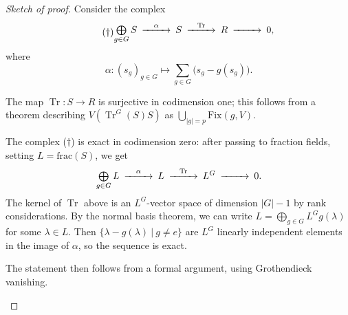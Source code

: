 \documentclass[12pt]{amsart}
\theoremstyle{definition}
\numberwithin{equation}{theorem}
\def\image{\operatorname{image}}
\def\Tr{\operatorname{Tr}}
\def\ff{\operatorname{frac}}
\def\frakn{\mathfrak{n}}
\def\to{\longrightarrow}
\def\mapsto{\longmapsto}
\begin{document}
\begin{proof}[Sketch of proof]
Consider the complex
\[ \tag{$\dagger$}
\CD
\bigoplus\limits_{g \in G} S @>\alpha>> S @>\Tr>> R @>>> 0,
\endCD
\]
where \[
\alpha\colon(s_g)_{g\in G} \mapsto \sum_{g\in G}\big(s_g - g(s_g)\big).
\]
\begin{asparaenum}
\item The map $\Tr:S \to R$ is surjective in codimension one; this follows from a theorem describing $V( \Tr^G(S) S )$ as $\bigcup_{|g|=p} \mathrm{Fix}(g,V)$.
\item The complex ($\dagger$) is  exact in codimension zero: after passing to fraction fields, setting $L=\mathrm{frac}(S)$, we get
\[ 
\CD
\bigoplus\limits_{g \in G} L @>\alpha>> L @>\Tr>> L^G @>>> 0.
\endCD
\]
The kernel of $\Tr$ above is an $L^G$-vector space of dimension $|G|-1$ by rank considerations. By the normal basis theorem, we can write $L=\bigoplus_{g\in G} L^G g(\lambda)$ for some $\lambda\in L$. Then $\{\lambda - g(\lambda) \ | \ g\neq e\}$ are $L^G$ linearly independent elements in the image of $\alpha$, so the sequence is exact.
\item The statement then follows from a formal argument, using Grothendieck vanishing.  \qedhere
\end{asparaenum}

\end{proof}
%
\end{document}
